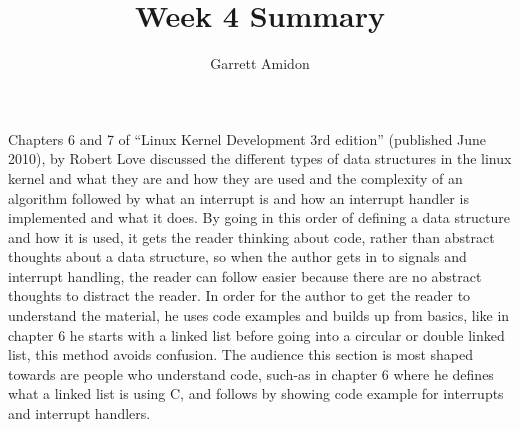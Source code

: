 \documentclass[a4paper]{article}
\title{Week 4 Summary}
\author{Garrett Amidon}
\begin{document}
\maketitle




\paragraph{}

Chapters 6 and 7 of “Linux Kernel Development 3rd edition” (published June 2010), by Robert Love discussed the different types of data structures in the linux kernel and what they are and how they are used and the complexity of an algorithm followed by what an interrupt is and how an interrupt handler is implemented and what it does. By going in this order of defining a data structure and how it is used, it gets the reader thinking about code, rather than abstract thoughts about a data structure, so when the author gets in to signals and interrupt handling, the reader can follow easier because there are no abstract thoughts to distract the reader. In order for the author to get the reader to understand the material, he uses code examples and builds up from basics, like in chapter 6 he starts with a linked list before going into a circular or double linked list, this method avoids confusion. The audience this section is most shaped towards are people who understand code, such-as in chapter 6 where he defines what a linked list is using C, and follows by showing code example for interrupts and interrupt handlers.
\end{document}
